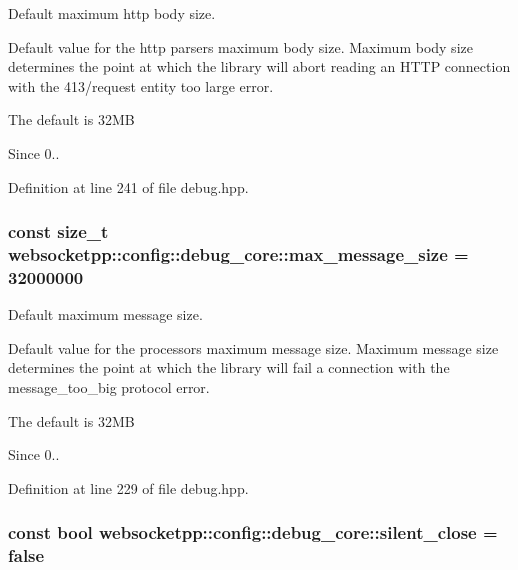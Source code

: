 Default maximum http body size. 

Default value for the http parser\textquotesingle{}s maximum body size. Maximum body size determines the point at which the library will abort reading an H\+T\+TP connection with the 413/request entity too large error.

The default is 32\+MB

\begin{DoxySince}{Since}
0.. 
\end{DoxySince}


Definition at line 241 of file debug.\+hpp.

\subsubsection[{\texorpdfstring{max\+\_\+message\+\_\+size}{max\_message\_size}}]{\setlength{\rightskip}{0pt plus 5cm}const size\+\_\+t websocketpp\+::config\+::debug\+\_\+core\+::max\+\_\+message\+\_\+size = 32000000\hspace{0.3cm}{\ttfamily [static]}}\hypertarget{structwebsocketpp_1_1config_1_1debug__core_a2c46fa8d65f3a6a69ccec42bd0e91e20}{}\label{structwebsocketpp_1_1config_1_1debug__core_a2c46fa8d65f3a6a69ccec42bd0e91e20}


Default maximum message size. 

Default value for the processor\textquotesingle{}s maximum message size. Maximum message size determines the point at which the library will fail a connection with the message\+\_\+too\+\_\+big protocol error.

The default is 32\+MB

\begin{DoxySince}{Since}
0.. 
\end{DoxySince}


Definition at line 229 of file debug.\+hpp.

\subsubsection[{\texorpdfstring{silent\+\_\+close}{silent\_close}}]{\setlength{\rightskip}{0pt plus 5cm}const bool websocketpp\+::config\+::debug\+\_\+core\+::silent\+\_\+close = false\hspace{0.3cm}{\ttfamily [static]}}\hypertarget{structwebsocketpp_1_1config_1_1debug__core_a961630bca024033059ef50863d1fc174}{}\label{structwebsocketpp_1_1config_1_1debug__core_a961630bca024033059ef50863d1fc174}


